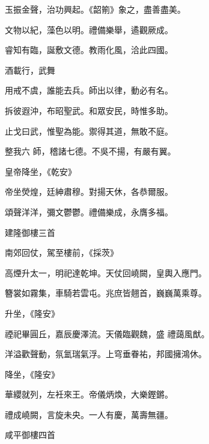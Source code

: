 \begin{pinyinscope}
 玉振金聲，治功興起。《韶箾》象之，盡善盡美。



 文物以紀，藻色以明。禮備樂舉，遹觀厥成。



 睿知有臨，誕敷文德。教雨化風，洽此四國。



 酒載行，武舞



 用戒不虞，誰能去兵。師出以律，動必有名。



 拆彼遐沖，布昭聖武。和眾安民，時惟多助。



 止戈曰武，惟聖為能。禦得其道，無敢不庭。



 整我六
 師，稽諸七德。不吳不揚，有嚴有翼。



 皇帝降坐，《乾安》



 帝坐熒煌，廷紳肅穆。對揚天休，各恭爾服。



 頌聲洋洋，彌文鬱鬱。禮備樂成，永膺多福。



 建隆御樓三首



 南郊回仗，駕至樓前，《採茨》



 高煙升太一，明祀達乾坤。天仗回嶢闕，皇輿入應門。



 簪裳如霧集，車騎若雲屯。兆庶皆翹首，巍巍萬乘尊。



 升坐，《隆安》



 禋祀畢圓丘，嘉辰慶澤流。天儀臨觀魏，盛
 禮藹風猷。



 洋溢歡聲動，氛氳瑞氣浮。上穹垂眷祐，邦國擁鴻休。



 降坐，《隆安》



 華纓就列，左衽來王。帝儀炳煥，大樂鏗鏘。



 禮成嶢闕，言旋未央。一人有慶，萬壽無疆。



 咸平御樓四首




\end{pinyinscope}
